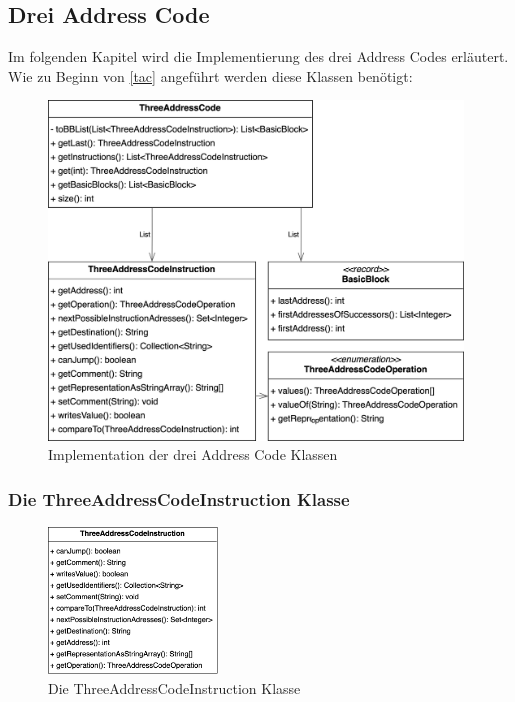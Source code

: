 \subsection{Drei Address Code}
Im folgenden Kapitel wird die Implementierung des drei Address Codes erläutert.
Wie zu Beginn von \cref{tac} angeführt werden diese Klassen benötigt:
\begin{figure}[h]
  \centering
  \includegraphics[width=0.98\textwidth]{fig/3AC_classes_methods.png}
  \caption{Implementation der drei Address Code Klassen}
  \label{fig:3ac-classes}
\end{figure}


\newpage
\subsubsection{Die ThreeAddressCodeInstruction Klasse}
\begin{figure}
  \centering
  \includegraphics[width=0.4\textwidth]{fig/3AC_ThreeAddressCodeInstruction_methods.png}
  \caption{Die ThreeAddressCodeInstruction Klasse}
  \label{fig:ThreeAddressCodeInstruction}
\end{figure}

